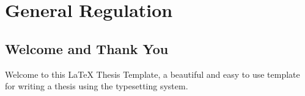 
\chapter{General Regulation } %

\label{Chapter4} %



\section{Welcome and Thank You}

Welcome to this \LaTeX{} Thesis Template, a beautiful and easy to use template for writing a thesis using the typesetting system.